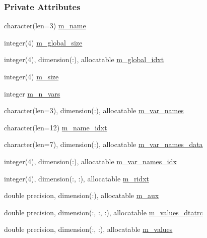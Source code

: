 \subsubsection*{Private Attributes}
\begin{DoxyCompactItemize}
\item 
character(len=3) \mbox{\hyperlink{structrivers__mod_1_1rivers_a421cdf84127a4dd69eff780d41170b3d}{m\+\_\+name}}
\item 
integer(4) \mbox{\hyperlink{structrivers__mod_1_1rivers_af71ac049d12dcd8a69adbac0e7b09134}{m\+\_\+global\+\_\+size}}
\item 
integer(4), dimension(\+:), allocatable \mbox{\hyperlink{structrivers__mod_1_1rivers_acd095de754fae3344e723d899335cba6}{m\+\_\+global\+\_\+idxt}}
\item 
integer(4) \mbox{\hyperlink{structrivers__mod_1_1rivers_acbec48622693bfb1b79cce4b90718e7d}{m\+\_\+size}}
\item 
integer \mbox{\hyperlink{structrivers__mod_1_1rivers_aa6f2afd13aef94d33f271874ad5c4f46}{m\+\_\+n\+\_\+vars}}
\item 
character(len=3), dimension(\+:), allocatable \mbox{\hyperlink{structrivers__mod_1_1rivers_ac0d31c21015866224b4124937901ffe7}{m\+\_\+var\+\_\+names}}
\item 
character(len=12) \mbox{\hyperlink{structrivers__mod_1_1rivers_a60422ea3260a9cd75931b5eaf65ba314}{m\+\_\+name\+\_\+idxt}}
\item 
character(len=7), dimension(\+:), allocatable \mbox{\hyperlink{structrivers__mod_1_1rivers_a48be3643f87dce758d6a72992fa129ae}{m\+\_\+var\+\_\+names\+\_\+data}}
\item 
integer(4), dimension(\+:), allocatable \mbox{\hyperlink{structrivers__mod_1_1rivers_a64986ca8554b5250658d7cf7b97218fb}{m\+\_\+var\+\_\+names\+\_\+idx}}
\item 
integer(4), dimension(\+:, \+:), allocatable \mbox{\hyperlink{structrivers__mod_1_1rivers_adbf8adce081563e1dff036ed90baa3ef}{m\+\_\+ridxt}}
\item 
double precision, dimension(\+:), allocatable \mbox{\hyperlink{structrivers__mod_1_1rivers_abf7afd67f998abeb46cdc4f91b460bc3}{m\+\_\+aux}}
\item 
double precision, dimension(\+:, \+:, \+:), allocatable \mbox{\hyperlink{structrivers__mod_1_1rivers_a75c34142c25f514950b789f5b90ff63b}{m\+\_\+values\+\_\+dtatrc}}
\item 
double precision, dimension(\+:, \+:), allocatable \mbox{\hyperlink{structrivers__mod_1_1rivers_a58530c3fd75177ebe8f2648ad4dccbfc}{m\+\_\+values}}
\end{DoxyCompactItemize}


